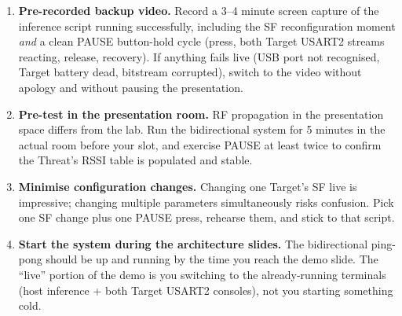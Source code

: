 \documentclass[11pt,letterpaper]{article}
\begin{document}
\begin{tcolorbox}[warning={Live Demo Redundancy Checklist}]
	\begin{enumerate}[leftmargin=1.2em]
		\item \textbf{Pre-recorded backup video.} Record a 3--4 minute screen capture of the inference script running successfully, including the SF reconfiguration moment \emph{and} a clean PAUSE button-hold cycle (press, both Target USART2 streams reacting, release, recovery). If anything fails live (\mbox{USB} port not recognised, Target battery dead, bitstream corrupted), switch to the video without apology and without pausing the presentation.
		\item \textbf{Pre-test in the presentation room.} \mbox{RF} propagation in the presentation space differs from the lab. Run the bidirectional system for 5 minutes in the actual room before your slot, and exercise PAUSE at least twice to confirm the Threat's RSSI table is populated and stable.
		\item \textbf{Minimise configuration changes.} Changing one Target's SF live is impressive; changing multiple parameters simultaneously risks confusion. Pick one SF change plus one PAUSE press, rehearse them, and stick to that script.
		\item \textbf{Start the system during the architecture slides.} The bidirectional ping-pong should be up and running by the time you reach the demo slide. The ``live'' portion of the demo is you switching to the already-running terminals (host inference + both Target USART2 consoles), not you starting something cold.
	\end{enumerate}
\end{tcolorbox}
\end{document}

